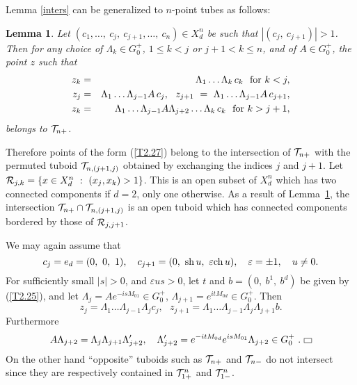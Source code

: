 \documentclass[a4paper,a4paper]{article}
\newtheorem{lemma}{Lemma}[section]
\def\RR{\mathbb R}
\def\ch{{\rm ch\,}}
\def\sh{{\rm sh\,}}
\def\RR{{\cal R}}
\def\TT{{\cal T}}
\def \veps{\varepsilon}
\def\boxit#1#2{\setbox1=\hbox{\kern#1{#2}\kern#1}%
\dimen1=\ht1 \advance \dimen1 by #1 \dimen2=\dp1 \advance \dimen2 by #1
\setbox1=\hbox{\vrule height\dimen1 depth\dimen2\box1\vrule}%
\setbox1=\vbox{\hrule\box1\hrule}%
\advance \dimen1 by .4pt \ht1=\dimen1 \advance \dimen2 by .4pt \dp1=\dimen2
\box1\relax}
\def\endprf{\raise .5ex\hbox{\boxit{2pt}{\ }}}
\def\Xdn{X_d^n}
\begin{document}
Lemma \ref{inters} can be generalized to $n$-point tubes as
follows:

\begin{lemma}
\label{intersn}
Let $(c_1,\ldots,\ c_j,\ c_{j+1},\ldots,\ c_n) \in \Xdn$ be such
that $|(c_j,\  c_{j+1})| > 1$.
Then for any choice of $\Lambda_k \in G_0^+$, $1\le k < j$ or
$j+1 < k \le n$, and of $A \in G_0^+$, the point $z$ such that
\begin{eqnarray}
z_k &=& \Lambda_1\ldots\Lambda_k\,c_k\ \ {\rm for}\ k <j,
\nonumber\\
z_j &=& \Lambda_1\ldots\Lambda_{j-1}A\,c_j,\ \
z_{j+1}\ =\ \Lambda_1\ldots\Lambda_{j-1}A\,c_{j+1},
\nonumber\\
z_k &=&  \Lambda_1\ldots\Lambda_{j-1}A\Lambda_{j+2}
\ldots \Lambda_k\,c_k\ \ {\rm for}\ k > j+1,
\label{T2.27}\end{eqnarray}
belongs to $\TT_{n+}$.
\end{lemma}

\vskip 0.25cm
\noindent Therefore points of the form (\ref{T2.27}) belong to the
intersection of $\TT_{n+}$ with the permuted tuboid $\TT_{n,(j+1,j)}$
obtained by exchanging the indices $j$ and $j+1$. Let
$\RR_{j,k} = \{x \in \Xdn\ :\ (x_j,x_k) >1\}$. This is an open
subset of $\Xdn$ which has two connected components if $d=2$,
only one otherwise. As a result of Lemma~\ref{intersn}, the intersection
$\TT_{n+} \cap \TT_{n,(j+1,j)}$ is an open tuboid which has connected
components bordered by those of $\RR_{j,j+1}$.

\vskip 0.25cm
We may again assume that
\begin{equation}
c_j = e_d = (0,\ 0,\ 1),\ \ \
c_{j+1} = (0,\ \sh u,\ \veps\ch u),\ \ \
\veps = \pm 1,\ \ \ u \not= 0.
\label{T2.28}\end{equation}
For sufficiently small $|s| >0$, and $\veps u s >0$,
let $t$ and $b = (0,\ b^1,\ b^d)$ be
given by (\ref{T2.25}), and let
$\Lambda_j = Ae^{-isM_{01}} \in G_0^+$,
$\Lambda_{j+1} = e^{it M_{0d}} \in G_0^+$. Then
\begin{equation}
z_j = \Lambda_1\ldots\Lambda_{j-1}\Lambda_j  c_j,\ \ \
z_{j+1} = \Lambda_1\ldots\Lambda_{j-1}\Lambda_j \Lambda_{j+1} b.
\label{T2.29}\end{equation}
Furthermore
\begin{equation}
A\Lambda_{j+2} =
\Lambda_j \Lambda_{j+1} \Lambda'_{j+2},\ \ \
\Lambda'_{j+2} =
e^{-it M_{0d}} e^{isM_{01}} \Lambda_{j+2} \in G_0^+\ .\ \hbox{\endprf}
\label{T2.30}\end{equation}
On the other hand ``opposite'' tuboids such as $\TT_{n+}$ and
$\TT_{n-}$ do not intersect since they are respectively contained
in $\TT_{1+}^n$ and $\TT_{1-}^n$.
\end{document}
